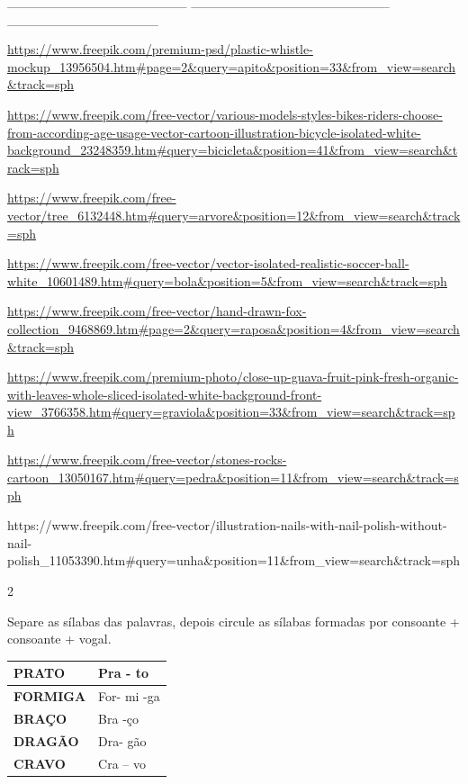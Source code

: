{{\_\_\_\_\_\_\_\_\_\_\_\_\_\_\_\_\_\_\_
\_\_\_\_\_\_\_\_\_\_\_\_\_\_\_\_\_\_\_\_\_
\_\_\_\_\_\_\_\_\_\_\_\_\_\_\_\_


\url{https://www.freepik.com/premium-psd/plastic-whistle-mockup_13956504.htm\#page=2\&query=apito\&position=33\&from_view=search\&track=sph}

\url{https://www.freepik.com/free-vector/various-models-styles-bikes-riders-choose-from-according-age-usage-vector-cartoon-illustration-bicycle-isolated-white-background_23248359.htm\#query=bicicleta\&position=41\&from_view=search\&track=sph}

\url{https://www.freepik.com/free-vector/tree_6132448.htm\#query=arvore\&position=12\&from_view=search\&track=sph}

\url{https://www.freepik.com/free-vector/vector-isolated-realistic-soccer-ball-white_10601489.htm\#query=bola\&position=5\&from_view=search\&track=sph}

\url{https://www.freepik.com/free-vector/hand-drawn-fox-collection_9468869.htm\#page=2\&query=raposa\&position=4\&from_view=search\&track=sph}

\url{https://www.freepik.com/premium-photo/close-up-guava-fruit-pink-fresh-organic-with-leaves-whole-sliced-isolated-white-background-front-view_3766358.htm\#query=graviola\&position=33\&from_view=search\&track=sph}

\url{https://www.freepik.com/free-vector/stones-rocks-cartoon_13050167.htm\#query=pedra\&position=11\&from_view=search\&track=sph}

https://www.freepik.com/free-vector/illustration-nails-with-nail-polish-without-nail-polish\_11053390.htm\#query=unha\&position=11\&from\_view=search\&track=sph

\num{2}

Separe as sílabas das palavras, depois circule as sílabas formadas por
consoante + consoante + vogal.


\begin{longtable}[]{@{}ll@{}}
\toprule
\textbf{PRATO} & Pra - to\tabularnewline
\midrule
\endhead
\textbf{FORMIGA} & For- mi -ga\tabularnewline
\textbf{BRAÇO} & Bra -ço\tabularnewline
\textbf{DRAGÃO} & Dra- gão\tabularnewline
\textbf{CRAVO} & Cra -- vo\tabularnewline
\bottomrule
\end{longtable}

}}
